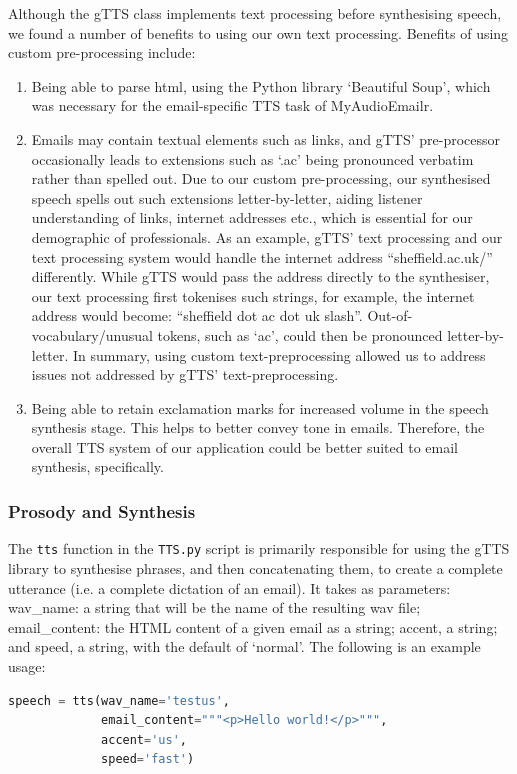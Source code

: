 \documentclass{article}
\begin{document}
Although the gTTS class implements text processing before synthesising speech, we found a number of benefits to using our own text processing. Benefits of using custom pre-processing include:

\begin{enumerate}
  \item Being able to parse html, using the Python library ‘Beautiful Soup’, which was necessary for the email-specific TTS task of MyAudioEmailr.
  \item Emails may contain textual elements such as links, and gTTS’ pre-processor occasionally leads to extensions such as ‘.ac’ being pronounced verbatim rather than spelled out. Due to our custom pre-processing, our synthesised speech spells out such extensions letter-by-letter, aiding listener understanding of links, internet addresses etc., which is essential for our demographic of professionals. As an example, gTTS’ text processing and our text processing system would handle the internet address “sheffield.ac.uk/” differently. While gTTS would pass the address directly to the synthesiser, our text processing first tokenises such strings, for example, the internet address would become: “sheffield dot ac dot uk slash”. Out-of-vocabulary/unusual tokens, such as ‘ac’, could then be pronounced letter-by-letter. In summary, using custom text-preprocessing allowed us to address issues not addressed by gTTS’ text-preprocessing. 
  \item Being able to retain exclamation marks for increased volume in the speech synthesis stage. This helps to better convey tone in emails. Therefore, the overall TTS system of our application could be better suited to email synthesis, specifically.
\end{enumerate}

\subsubsection{Prosody and Synthesis}
The \texttt{tts} function in the \texttt{TTS.py} script is primarily responsible for using the gTTS library to synthesise phrases, and then concatenating them, to create a complete utterance (i.e. a complete dictation of an email). It takes as parameters: wav\_name: a string that will be the name of the resulting wav file; email\_content: the HTML content of a given email as a string; accent, a string; and speed, a string, with the default of ‘normal’. The following is an example usage:

\begin{lstlisting}[language=Python]
speech = tts(wav_name='testus',
             email_content="""<p>Hello world!</p>""",
             accent='us',
             speed='fast')
\end{lstlisting}
\end{document}
